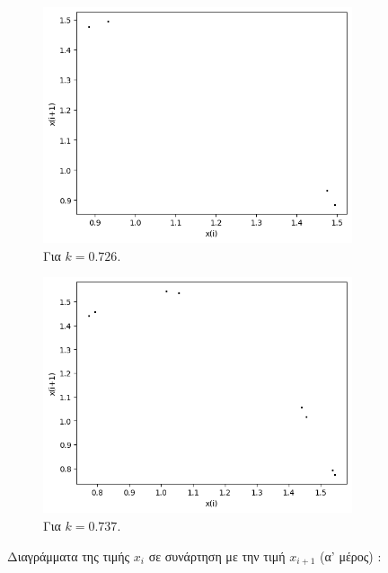 \begin{figure}[h!]
\begin{subfigure}[b]{0.4\textwidth}
		\includegraphics[width=\textwidth]{LateX images/graphs q14/g15}
		\caption{Για $k=0.726$.}
		\label{f:k72}
	\end{subfigure}
	\hfill
	\begin{subfigure}[b]{0.4\textwidth}
		\centering
		\includegraphics[width=\textwidth]{LateX images/graphs q14/g16}
		\caption{Για $k=0.737$.}
		\label{f:k73}
	\end{subfigure}
	\hfill
	\caption{Διαγράμματα της τιμής \(x_i\) σε συνάρτηση με την τιμή \(x_{i+1}\) (α' μέρος) :}
\end{figure}
